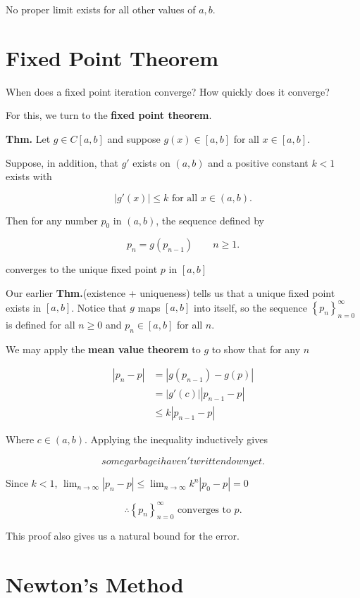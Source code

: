 \documentclass[12pt]{article}
\newcommand{\thm}{\textbf{Thm.}\xspace}
\begin{document}
No proper limit exists for all other values of $a, b$.

\section{Fixed Point Theorem}

When does a fixed point iteration converge? How quickly does it converge?

For this, we turn to the \textbf{fixed point theorem}.

\thm Let $g\in C[a,b]$ and suppose $g(x) \in [a, b]$ for all $x \in [a,b]$.

Suppose, in addition, that $g'$ exists on $(a,b)$ and a positive constant $k<1$
exists with 

\[
|g'(x)| \leq k \text{ for all } x \in (a,b)
.\]

Then for any number $p_0$ in $(a,b)$, the sequence defined by

\[
  p_n = g(p_{n-1}) \qquad n \geq 1
.\]

converges to the unique fixed point $p$ in $[a, b]$

\proof

Our earlier \thm (existence + uniqueness) tells us that a unique fixed point
exists in $[a,b]$. Notice that $g$ maps $[a, b]$ into itself, so the sequence 
$\displaystyle \left\{ p_n \right\}_{n=0}^\infty$ is defined for all $n \geq 0$
and $p_n \in [a, b]$ for all $n$.

We may apply the \textbf{mean value theorem} to $g$ to show that for any $n$

\begin{align*}
  |p_n-p| &= |g(p_{n-1}) - g(p)| \\
          &= |g'(c)||p_{n-1}-p| \\
          &\leq k|p_{n-1}-p|
\end{align*}

Where $c \in (a,b)$. Applying the inequality inductively gives 

\[
some garbage i haven't written down yet
.\]

Since $k<1$, $\displaystyle \lim_{n\to\infty} |p_n-p| \leq \lim_{n\to\infty} k^n|p_0-p| = 0$

\[
  \therefore \left\{ p_n \right\}_{n=0}^\infty \text{ converges to } p 
.\]

This proof also gives us a natural bound for the error. 

\section{Newton's Method}
\end{document}
